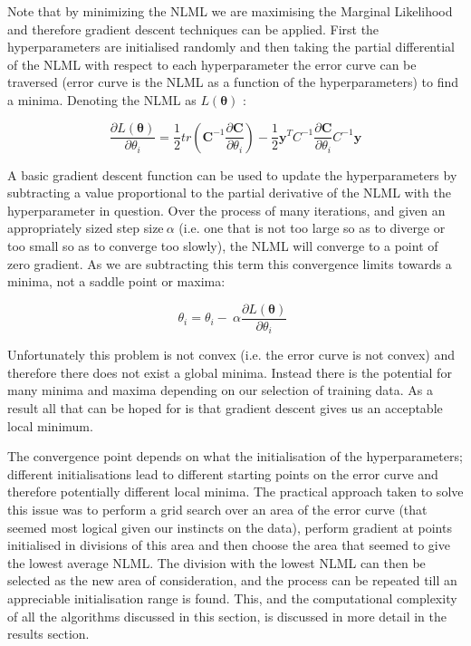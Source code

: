 \documentclass[10.5pt,a4paper,twoside]{report}   %
\begin{document}
Note that by minimizing the NLML we are maximising the Marginal Likelihood and therefore gradient descent techniques can be applied. First the hyperparameters are initialised randomly and then taking the partial differential of the NLML with respect to each hyperparameter the error curve can be traversed (error curve is the NLML as a function of the hyperparameters) to find a minima. Denoting the NLML as $L\left({\mathbf \theta }\right)$ \cite{edsnelgpr}: 

\begin{equation} 
\frac{\partial L\left(\boldsymbol{\theta }\right)}{\partial {\theta }_i}=\frac{1}{2}tr\left({\boldsymbol{C}}^{-1}\frac{\partial \boldsymbol{C}}{\partial {\theta }_i}\right)-\frac{1}{2}{\boldsymbol{y}}^TC^{-1}\frac{\partial \boldsymbol{C}}{\partial {\theta }_i}C^{-1}\boldsymbol{y}
\end{equation} 

A basic gradient descent function can be used to update the hyperparameters by subtracting a value proportional to the partial derivative of the NLML with the hyperparameter in question. Over the process of many iterations, and given an appropriately sized step size$\ \alpha $ (i.e. one that is not too large so as to diverge or too small so as to converge too slowly), the NLML will converge to a point of zero gradient. As we are subtracting this term this convergence limits towards a minima, not a saddle point or maxima:

\begin{equation} 
{\theta }_i={\theta }_i-\ \alpha \frac{\partial L\left({\mathbf \theta }\right)}{\partial {\theta }_i}\ \ 
\end{equation} 

Unfortunately this problem is not convex (i.e. the error curve is not convex) and therefore there does not exist a global minima. Instead there is the potential for many minima and maxima depending on our selection of training data. As a result all that can be hoped for is that gradient descent gives us an acceptable local minimum. 

The convergence point depends on what the initialisation of the hyperparameters; different initialisations lead to different starting points on the error curve and therefore potentially different local minima. The practical approach taken to solve this issue was to perform a grid search over an area of the error curve (that seemed most logical given our instincts on the data), perform gradient at points initialised in divisions of this area and then choose the area that seemed to give the lowest average NLML. The division with the lowest NLML can then be selected as the new area of consideration, and the process can be repeated till an appreciable initialisation range is found. This, and the computational complexity of all the algorithms discussed in this section, is discussed in more detail in the results section. 
\end{document}
